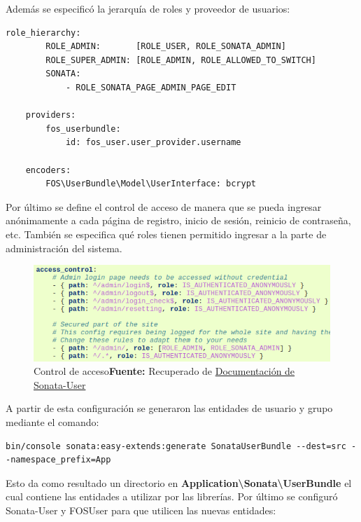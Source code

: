 \noindent
Además se especificó la jerarquía de roles y proveedor de usuarios:

\begin{lstlisting}[caption={Jerarquía de roles, tipo de encriptación y proveedor de usuarios}]
    role_hierarchy:
        ROLE_ADMIN:       [ROLE_USER, ROLE_SONATA_ADMIN]
        ROLE_SUPER_ADMIN: [ROLE_ADMIN, ROLE_ALLOWED_TO_SWITCH]
        SONATA:
            - ROLE_SONATA_PAGE_ADMIN_PAGE_EDIT

    providers:
        fos_userbundle:
            id: fos_user.user_provider.username

    encoders:
        FOS\UserBundle\Model\UserInterface: bcrypt
\end{lstlisting}

\newpage
Por último se define el control de acceso de manera que se pueda ingresar anónimamente a cada página de registro, inicio de sesión, reinicio de contraseña,
etc.
También se especifica qué roles tienen permitido ingresar a la parte de administración del sistema.

\begin{figure}[h]
    \includegraphics[width=1\linewidth]{image/acl.png}
    \caption{Control de acceso\newline \textbf{Fuente:} Recuperado de \href{https://sonata-project.org/bundles/user/master/doc/reference/installation.html}{Documentación de Sonata-User}}
    \label{fig:image/acl}
\end{figure}


A partir de esta configuración se generaron las entidades de usuario y grupo mediante el comando:

\begin{lstlisting}
bin/console sonata:easy-extends:generate SonataUserBundle --dest=src --namespace_prefix=App
\end{lstlisting}


Esto da como resultado un directorio en \textbf{Application\textbackslash Sonata\textbackslash UserBundle} el cual contiene las entidades a utilizar por las librerías.
Por último se configuró Sonata-User y FOSUser para que utilicen las nuevas entidades:

